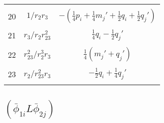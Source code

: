 \documentclass[Dissertation.tex]{subfiles}
\begin{document}
\begin{center}
\begin{longtable}{|c|c|c|}
&  &  \\
20  & $1/r_2 r_3$  & $-(\frac{1}{4}p_i + \frac{1}{4} m_j' + \frac{1}{2} q_i + \frac{1}{2} q_j')$ \\
&  &  \\
21  & $r_3/r_2 r_{23}^2$  & $\frac{1}{4} q_i - \frac{1}{2} q_j'$ \\
&  &  \\
22  & $r_{23}^2/r_2^3 r_3$  & $\frac{1}{4} (m_j' + q_j')$ \\
&  &  \\
23  & $r_2/r_{23}^2 r_3$  & $-\frac{1}{2} q_i + \frac{1}{4} q_j'$ \\
&  &  \\
\end{longtable}
\end{center}



\subsection[(phi1i L phi2j)]{${(\bar\phi_{1i} L \bar\phi_{2j})}$}
\end{document}
